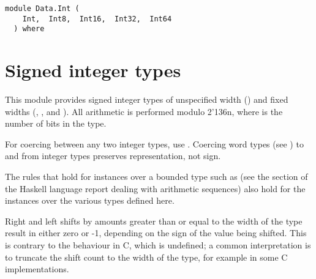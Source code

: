 \label{module:Data.Int}
\haddockbeginheader
{\haddockverb\begin{verbatim}
module Data.Int (
    Int,  Int8,  Int16,  Int32,  Int64
  ) where\end{verbatim}}
\haddockendheader

\section{Signed integer types
}
This module provides signed integer types of unspecified width ()
and fixed widths (, ,  and ).  All
arithmetic is performed modulo 2{\char '136}n, where  is the number of bits in
the type.
\par
For coercing between any two integer types, use
.  Coercing word types (see ) to and
from integer types preserves representation, not sign.
\par
The rules that hold for  instances over a bounded type
such as  (see the section of the Haskell language report dealing with
arithmetic sequences) also hold for the  instances over
the various  types defined here.
\par
Right and left shifts by amounts greater than or equal to the width of
the type result in either zero or -1, depending on the sign of the
value being shifted.  This is contrary to the behaviour in C, which is
undefined; a common interpretation is to truncate the shift count to
the width of the type, for example  in some C
implementations.
\par

